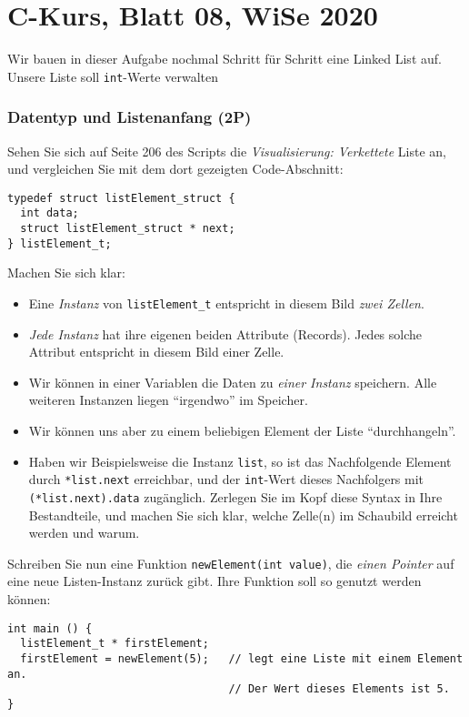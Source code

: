 \documentclass[
	ngerman,
	fontsize=10pt,
	parskip=half,
	titlepage=true,
	DIV=12
]{scrartcl}
\newcommand*{\inC}[1]{\texttt{#1}}
\begin{document}
\part*{C-Kurs, Blatt 08, WiSe 2020}

Wir bauen in dieser Aufgabe nochmal Schritt für Schritt eine Linked List auf. Unsere Liste soll \inC{int}-Werte verwalten

\section{Datentyp und Listenanfang (2P)}
Sehen Sie sich auf Seite 206 des Scripts die \emph{Visualisierung: Verkettete} Liste an, und vergleichen Sie mit dem dort gezeigten Code-Abschnitt:
\begin{verbatim}
typedef struct listElement_struct {
  int data;
  struct listElement_struct * next;
} listElement_t;
\end{verbatim}

Machen Sie sich klar:
\begin{itemize}
\item Eine \emph{Instanz} von \texttt{listElement\_t} entspricht in diesem Bild \emph{zwei Zellen}.
\item \emph{Jede Instanz} hat ihre eigenen beiden Attribute (Records). Jedes solche Attribut entspricht in diesem Bild einer Zelle.
\item Wir können in einer Variablen die Daten zu \emph{einer Instanz} speichern. Alle weiteren Instanzen liegen \enquote{irgendwo} im Speicher.
\item Wir können uns aber zu einem beliebigen Element der Liste \enquote{durchhangeln}.
\item Haben wir Beispielsweise die Instanz \texttt{list}, so ist das Nachfolgende Element durch \texttt{*list.next} erreichbar, und der \inC{int}-Wert dieses
	Nachfolgers mit \texttt{(*list.next).data} zugänglich. Zerlegen Sie im Kopf diese Syntax in Ihre Bestandteile, und machen Sie sich klar, welche Zelle(n) im Schaubild
	erreicht werden und warum.
\end{itemize}

Schreiben Sie nun eine Funktion \texttt{newElement(int value)}, die \emph{einen Pointer} auf eine neue Listen-Instanz zurück gibt. Ihre Funktion soll so genutzt werden können:

\begin{verbatim}
int main () {
  listElement_t * firstElement;
  firstElement = newElement(5);   // legt eine Liste mit einem Element an.
                                  // Der Wert dieses Elements ist 5.
}
\end{verbatim}
\end{document}
